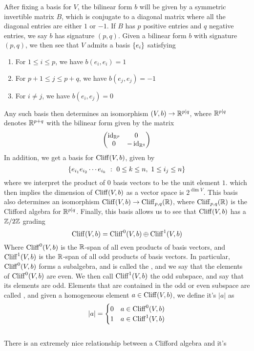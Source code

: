 After fixing a basis for $V$, the bilinear form $b$ will be given by a symmetric
invertible matrix $B$, which is conjugate to a diagonal matrix where all
the diagonal entries are either $1$ or $-1$. If $B$ has $p$ positive entries
and $q$ negative entries, we say $b$ has signature $(p,q)$. Given a bilinear
form $b$ with signature $(p,q)$, we then see that $V$ admits a basis
$\left\lbrace e_i \right\rbrace$ satisfying
%
\begin{enumerate}
  \item For $1 \leq i \leq p$, we have $b(e_i,e_i) = 1$
  \item For $p+1 \leq j \leq p+q$, we have $b(e_j,e_j) = -1$
  \item For $i \neq j$, we have $b(e_i,e_j) = 0$
\end{enumerate}
%
Any such basis then determines an isomorphism $(V,b) \to \mathbb{R}^{p|q}$, where
$\mathbb{R}^{p|q}$ denotes $\mathbb{R}^{p+q}$ with the bilinear form given by the matrix
\[
\begin{pmatrix}
\operatorname{id}_{\mathbb{R}^p} & 0 \\
0 & -\operatorname{id}_{\mathbb{R}^q}
\end{pmatrix}
\]
In addition, we get a basis for $\operatorname{Cliff}(V,b)$, given by
\[
\left\lbrace e_{i_1}e_{i_2}\cdots e_{i_k}~:~ 0 \leq k \leq n, ~ 1 \leq i_j \leq n \right\rbrace
\]
where we interpret the product of $0$ basis vectors to be the unit element $1$.
which then implies the dimension of $\operatorname{Cliff}(V,b)$ as a vector space is
$2^{\dim V}$. This basis also determines an isomorphism
$\operatorname{Cliff}(V,b) \to \operatorname{Cliff}_{p,q}(\mathbb{R})$, where $\operatorname{Cliff}_{p,q}(\mathbb{R})$ is the Clifford
algebra for $\mathbb{R}^{p|q}$. Finally, this basis allows us to see that $\operatorname{Cliff}(V,b)$
has a $\mathbb{Z}/2\mathbb{Z}$ grading
\[
\operatorname{Cliff}(V,b) = \operatorname{Cliff}^0(V,b) \oplus \operatorname{Cliff}^1(V,b)
\]
Where $\operatorname{Cliff}^0(V,b)$ is the $\mathbb{R}$-span of all even products of basis vectors,
and $\operatorname{Cliff}^1(V,b)$ is the $\mathbb{R}$-span of all odd products of basis vectors. In
particular, $\operatorname{Cliff}^0(V,b)$ forms a subalgebra, and is called the , and we say that the elements of $\operatorname{Cliff}^0(V,b)$ are even. We then
call $\operatorname{Cliff}^1(V,b)$ the odd subspace, and say that its elements are odd.
Elements that are contained in the odd or even subspace are called
, and given a homogeneous element $a \in \operatorname{Cliff}(V,b)$,
we define it's  $|a|$ as
\[
|a| = \begin{cases}
0 & a \in \operatorname{Cliff}^0(V,b) \\
1 & a \in \operatorname{Cliff}^1(V,b)
\end{cases}
\]\\
There is an extremely nice relationship between a Clifford algebra and it's
